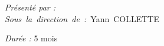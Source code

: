 \begin{multicols}{2}
	\vspace*{\fill}
	\begin{flushleft}
	
	
		\textit{Présenté par :} \@author									\\
		\mbox{\textit{Sous la direction de :} Yann COLLETTE}
		
		
	\end{flushleft}
\columnbreak
	\vspace*{\fill}
	
	\begin{flushright}
	
		
		\textit{Durée :} 5 mois												\\
		\@date
		
		
	\end{flushright}
\end{multicols}



\makeatother %